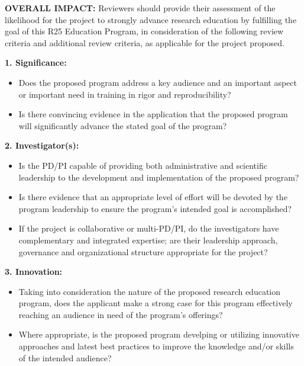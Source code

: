 \documentclass[pdftex,english,11pt,parskip=half]{scrartcl}
\begin{document}
\def\bf{\normalfont\bfseries}
\pagestyle{empty}

\textbf{OVERALL IMPACT:} Reviewers should provide their assessment of the likelihood for the project to strongly advance research education by fulfilling the goal of this R25 Education Program, in consideration of the following review criteria and additional review criteria, as applicable for the project proposed.

\textbf{1. Significance:}

\begin{itemize}
\item Does the proposed program address a key audience and an important aspect or important need in training in rigor and reproducibility?
\item Is there convincing evidence in the application that the proposed program will significantly advance the stated goal of the program?
\end{itemize}

\textbf{2. Investigator(s):}

\begin{itemize}
\item Is the PD/PI capable of providing both administrative and scientific leadership to the development and implementation of the proposed program?
\item Is there evidence that an appropriate level of effort will be devoted by the program leadership to ensure the program's intended goal is accomplished?
\item If the project is collaborative or multi-PD/PI, do the investigators have complementary and integrated expertise; are their leadership approach, governance and organizational structure appropriate for the project?
\end{itemize}

\textbf{3. Innovation:}

\begin{itemize}
\item Taking into consideration the nature of the proposed research education program, does the applicant make a strong case for this program effectively reaching an audience in need of the program's offerings?
\item Where appropriate, is the proposed program develping or utilizing innovative approaches and latest best practices to improve the knowledge and/or skills of the intended audience?
\end{itemize}
\end{document}
